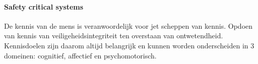 %
%
%
%
%
%
%





\paragraph{Safety critical systems}


De kennis van de mens is veranwoordelijk voor jet scheppen van kennis. Opdoen van kennis van veiligeheidsintegriteit ten overstaan van ontwetendheid. Kennisdoelen zijn daarom altijd belangrijk en kunnen worden onderscheiden in 3 domeinen: cognitief, affectief en psychomotorisch.

